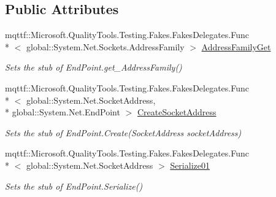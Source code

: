 \subsection*{Public Attributes}
\begin{DoxyCompactItemize}
\item 
mqttf\-::\-Microsoft.\-Quality\-Tools.\-Testing.\-Fakes.\-Fakes\-Delegates.\-Func\\*
$<$ global\-::\-System.\-Net.\-Sockets.\-Address\-Family $>$ \hyperlink{class_system_1_1_net_1_1_fakes_1_1_stub_end_point_a1aba2d672d9bb82c389dd3f063c7ec91}{Address\-Family\-Get}
\begin{DoxyCompactList}\small\item\em Sets the stub of End\-Point.\-get\-\_\-\-Address\-Family()\end{DoxyCompactList}\item 
mqttf\-::\-Microsoft.\-Quality\-Tools.\-Testing.\-Fakes.\-Fakes\-Delegates.\-Func\\*
$<$ global\-::\-System.\-Net.\-Socket\-Address, \\*
global\-::\-System.\-Net.\-End\-Point $>$ \hyperlink{class_system_1_1_net_1_1_fakes_1_1_stub_end_point_ae991aa68393dda2ee232505cb37a82df}{Create\-Socket\-Address}
\begin{DoxyCompactList}\small\item\em Sets the stub of End\-Point.\-Create(\-Socket\-Address socket\-Address)\end{DoxyCompactList}\item 
mqttf\-::\-Microsoft.\-Quality\-Tools.\-Testing.\-Fakes.\-Fakes\-Delegates.\-Func\\*
$<$ global\-::\-System.\-Net.\-Socket\-Address $>$ \hyperlink{class_system_1_1_net_1_1_fakes_1_1_stub_end_point_adc059ec4e6206dea2aebf68ff98347a2}{Serialize01}
\begin{DoxyCompactList}\small\item\em Sets the stub of End\-Point.\-Serialize()\end{DoxyCompactList}\end{DoxyCompactItemize}
